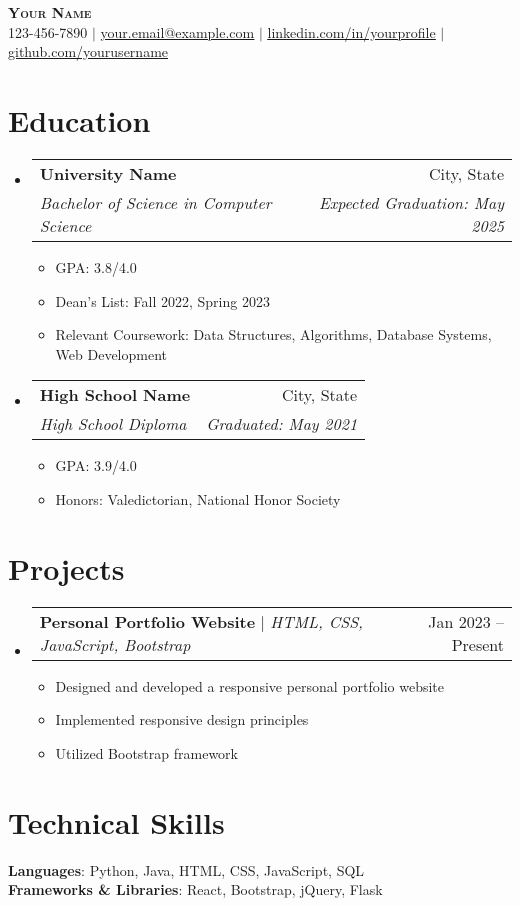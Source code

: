 \documentclass[letterpaper,11pt]{article}
\makeatletter
\newcommand{\resumeItem}[1]{
  \item\small{
    {#1 \vspace{-2pt}}
  }
}
\newcommand{\resumeSubheading}[4]{
  \vspace{-2pt}\item
    \begin{tabular*}{0.97\textwidth}[t]{l@{\extracolsep{\fill}}r}
      \textbf{#1} & #2 \\
      \textit{\small#3} & \textit{\small #4} \\
    \end{tabular*}\vspace{-7pt}
}
\newcommand{\resumeProjectHeading}[2]{
    \item
    \begin{tabular*}{0.97\textwidth}{l@{\extracolsep{\fill}}r}
      \small#1 & #2 \\
    \end{tabular*}\vspace{-7pt}
}
\newcommand{\resumeSubHeadingListStart}{\begin{itemize}[leftmargin=0.15in, label={}]}
\newcommand{\resumeSubHeadingListEnd}{\end{itemize}}
\newcommand{\resumeItemListStart}{\begin{itemize}}
\newcommand{\resumeItemListEnd}{\end{itemize}\vspace{-5pt}}
\makeatother
\begin{document}
\begin{center}
    \textbf{\Huge \scshape Your Name} \\ \vspace{1pt}
    \small 123-456-7890 $|$ \href{mailto:your.email@example.com}{\underline{your.email@example.com}} $|$ 
    \href{https://linkedin.com/in/yourprofile}{\underline{linkedin.com/in/yourprofile}} $|$
    \href{https://github.com/yourusername}{\underline{github.com/yourusername}}
\end{center}

\section{Education}
  \resumeSubHeadingListStart
    \resumeSubheading
      {University Name}{City, State}
      {Bachelor of Science in Computer Science}{Expected Graduation: May 2025}
      \resumeItemListStart
        \resumeItem{GPA: 3.8/4.0}
        \resumeItem{Dean's List: Fall 2022, Spring 2023}
        \resumeItem{Relevant Coursework: Data Structures, Algorithms, Database Systems, Web Development}
      \resumeItemListEnd
    \resumeSubheading
      {High School Name}{City, State}
      {High School Diploma}{Graduated: May 2021}
      \resumeItemListStart
        \resumeItem{GPA: 3.9/4.0}
        \resumeItem{Honors: Valedictorian, National Honor Society}
      \resumeItemListEnd
  \resumeSubHeadingListEnd

\section{Projects}
  \resumeSubHeadingListStart
    \resumeProjectHeading
        {\textbf{Personal Portfolio Website} $|$ \emph{HTML, CSS, JavaScript, Bootstrap}}{Jan 2023 -- Present}
        \resumeItemListStart
          \resumeItem{Designed and developed a responsive personal portfolio website}
          \resumeItem{Implemented responsive design principles}
          \resumeItem{Utilized Bootstrap framework}
        \resumeItemListEnd
  \resumeSubHeadingListEnd

\section{Technical Skills}
 \begin{itemize}[leftmargin=0.15in, label={}]
    \small{\item{
     \textbf{Languages}{: Python, Java, HTML, CSS, JavaScript, SQL} \\
     \textbf{Frameworks \& Libraries}{: React, Bootstrap, jQuery, Flask}
    }}
 \end{itemize}

\end{document}
